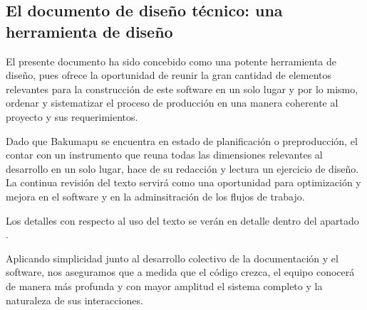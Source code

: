 \subsection{El documento de diseño técnico: una herramienta de
diseño}\label{principios:documento-tecnico-como-herramienta} El presente
documento ha sido concebido como una potente herramienta de diseño, pues ofrece
la oportunidad de reunir la gran cantidad de elementos relevantes para la
construcción de este software en un solo lugar y por lo mismo, ordenar y
sistematizar el proceso de producción en una manera coherente al proyecto y sus
requerimientos.

Dado que Bakumapu se encuentra en estado de planificación o preproducción, el
contar con un instrumento que reuna todas las dimensiones relevantes al
desarrollo en un solo lugar, hace de su redacción y lectura un ejercicio de
diseño. La continua revisión del texto servirá como una oportunidad para
optimización y mejora en el software y en la adminsitración de los flujos de
trabajo.

Los detalles con respecto al uso del texto se verán en detalle dentro del
apartado .

Aplicando simplicidad junto al desarrollo colectivo de la documentación y el
software, nos aseguramos que a medida que el código crezca, el equipo conocerá
de manera más profunda y con mayor amplitud el sistema completo y la naturaleza
de sus interacciones.
